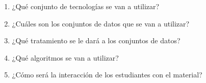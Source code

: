 \begin{enumerate}
	\item ¿Qu\'e conjunto de tecnolog\'ias se van a utilizar?
	\item ¿Cu\'ales son los conjuntos de datos que se van a utilizar?
	\item ¿Qu\'e tratamiento se le dar\'a a los conjuntos de datos?
	\item ¿Qu\'e algoritmos se van a utilizar?
	\item ¿C\'omo ser\'a la interacci\'on de los estudiantes con el material?
\end{enumerate}





